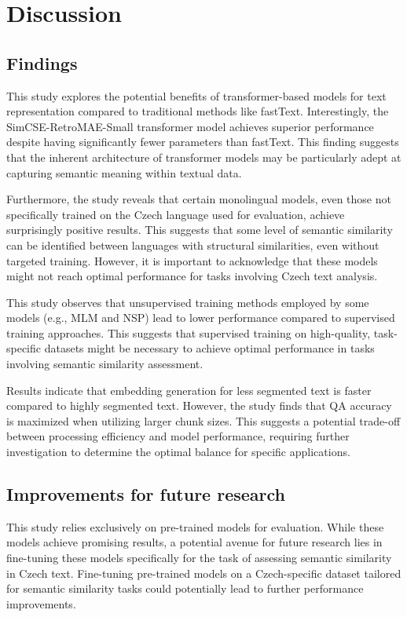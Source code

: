 
\chapter{Discussion\label{chap:discussion}}

\section{Findings}
This study explores the potential benefits of transformer-based models for text representation compared to traditional methods like fastText.
Interestingly, the SimCSE-RetroMAE-Small transformer model achieves superior performance despite having significantly fewer parameters than fastText.
This finding suggests that the inherent architecture of transformer models may be particularly adept at capturing semantic meaning within textual data.

Furthermore, the study reveals that certain monolingual models, even those not specifically trained on the Czech language used for evaluation, achieve surprisingly positive results.
This suggests that some level of semantic similarity can be identified between languages with structural similarities, even without targeted training.
However, it is important to acknowledge that these models might not reach optimal performance for tasks involving Czech text analysis.

This study observes that unsupervised training methods employed by some models (e.g., MLM and NSP) lead to lower performance compared to supervised training approaches.
This suggests that supervised training on high-quality, task-specific datasets might be necessary to achieve optimal performance in tasks involving semantic similarity assessment.

Results indicate that embedding generation for less segmented text is faster compared to highly segmented text.
However, the study finds that \ac{QA} accuracy is maximized when utilizing larger chunk sizes.
This suggests a potential trade-off between processing efficiency and model performance, requiring further investigation to determine the optimal balance for specific applications.

\section{Improvements for future research}
This study relies exclusively on pre-trained models for evaluation.
While these models achieve promising results, a potential avenue for future research lies in fine-tuning these models specifically for the task of assessing semantic similarity in Czech text.
Fine-tuning pre-trained models on a Czech-specific dataset tailored for semantic similarity tasks could potentially lead to further performance improvements.

